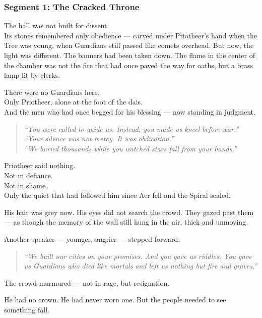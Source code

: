 \documentclass[9pt]{article}
\begin{document}
\newpage

\subsubsection*{Segment 1: The Cracked Throne}

The hall was not built for dissent.\\
Its stones remembered only obedience --- carved under Priotheer’s hand when the Tree was young, when Guardians still passed like comets overhead. But now, the light was different. The banners had been taken down. The flame in the center of the chamber was not the fire that had once paved the way for oaths, but a brass lamp lit by clerks.

There were no Guardians here.\\
Only Priotheer, alone at the foot of the dais.\\
And the men who had once begged for his blessing --- now standing in judgment.

\begin{quote}
\textit{“You were called to guide us. Instead, you made us kneel before war.”}\\
\textit{“Your silence was not mercy. It was abdication.”}\\
\textit{“We buried thousands while you watched stars fall from your hands.”}
\end{quote}

Priotheer said nothing.\\
Not in defiance.\\
Not in shame.\\
Only the quiet that had followed him since Aer fell and the Spiral sealed.

His hair was grey now. His eyes did not search the crowd. They gazed past them --- as though the memory of the wall still hung in the air, thick and unmoving.

Another speaker --- younger, angrier --- stepped forward:

\begin{quote}
\textit{“We built our cities on your promises. And you gave us riddles. You gave us Guardians who died like mortals and left us nothing but fire and graves.”}
\end{quote}

The crowd murmured --- not in rage, but resignation.

He had no crown. He had never worn one. But the people needed to see something fall.
\end{document}
